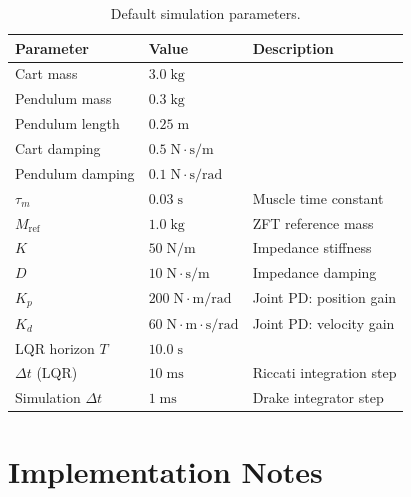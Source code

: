 \documentclass[11pt, a4paper]{article}
\begin{document}
\begin{table}[H]
\centering
\caption{Default simulation parameters.}
\renewcommand{\arraystretch}{1.3}
\begin{tabular}{lll}
\toprule
\textbf{Parameter} & \textbf{Value} & \textbf{Description} \\
\midrule
Cart mass           & $3.0\;\mathrm{kg}$  & \\
Pendulum mass       & $0.3\;\mathrm{kg}$  & \\
Pendulum length     & $0.25\;\mathrm{m}$  & \\
Cart damping        & $0.5\;\mathrm{N\cdot s/m}$ & \\
Pendulum damping    & $0.1\;\mathrm{N\cdot s/rad}$ & \\
$\tau_m$            & $0.03\;\mathrm{s}$   & Muscle time constant \\
$M_{\mathrm{ref}}$  & $1.0\;\mathrm{kg}$   & ZFT reference mass \\
$K$                 & $50\;\mathrm{N/m}$   & Impedance stiffness \\
$D$                 & $10\;\mathrm{N\cdot s/m}$ & Impedance damping \\
$K_p$               & $200\;\mathrm{N\cdot m/rad}$ & Joint PD: position gain \\
$K_d$               & $60\;\mathrm{N\cdot m\cdot s/rad}$ & Joint PD: velocity gain \\
LQR horizon $T$     & $10.0\;\mathrm{s}$   & \\
$\Delta t$ (LQR)    & $10\;\mathrm{ms}$    & Riccati integration step \\
Simulation $\Delta t$ & $1\;\mathrm{ms}$   & Drake integrator step \\
\bottomrule
\end{tabular}
\end{table}

\section{Implementation Notes}
\end{document}
